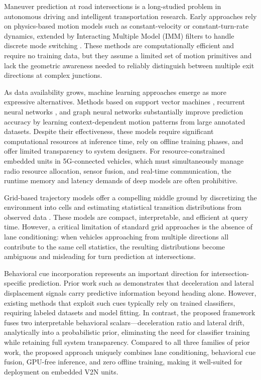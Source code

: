 \documentclass[conference]{IEEEtran}
\begin{document}
Maneuver prediction at road intersections is a long-studied problem in autonomous driving and intelligent transportation research.
Early approaches rely on physics-based motion models such as constant-velocity or constant-turn-rate dynamics, extended by Interacting Multiple Model (IMM) filters to handle discrete mode switching \cite{lefevre2014survey}.
These methods are computationally efficient and require no training data, but they assume a limited set of motion primitives and lack the geometric awareness needed to reliably distinguish between multiple exit directions at complex junctions.

As data availability grows, machine learning approaches emerge as more expressive alternatives.
Methods based on support vector machines \cite{schmerling2018multimodal}, recurrent neural networks \cite{altche2017lstm}, and graph neural networks \cite{lefkopoulos2021interaction} substantially improve prediction accuracy by learning context-dependent motion patterns from large annotated datasets.
Despite their effectiveness, these models require significant computational resources at inference time, rely on offline training phases, and offer limited transparency to system designers.
For resource-constrained embedded units in 5G-connected vehicles, which must simultaneously manage radio resource allocation, sensor fusion, and real-time communication, the runtime memory and latency demands of deep models are often prohibitive.

Grid-based trajectory models offer a compelling middle ground by discretizing the environment into cells and estimating statistical transition distributions from observed data \cite{katrakazas2015real}.
These models are compact, interpretable, and efficient at query time.
However, a critical limitation of standard grid approaches is the absence of lane conditioning: when vehicles approaching from multiple directions all contribute to the same cell statistics, the resulting distributions become ambiguous and misleading for turn prediction at intersections.

Behavioral cue incorporation represents an important direction for intersection-specific prediction.
Prior work such as \cite{klingelschmitt2014combining} demonstrates that deceleration and lateral displacement signals carry predictive information beyond heading alone.
However, existing methods that exploit such cues typically rely on trained classifiers, requiring labeled datasets and model fitting.
In contrast, the proposed framework fuses two interpretable behavioral scalars---deceleration ratio and lateral drift, analytically into a probabilistic prior, eliminating the need for classifier training while retaining full system transparency.
Compared to all three families of prior work, the proposed approach uniquely combines lane conditioning, behavioral cue fusion, GPU-free inference, and zero offline training, making it well-suited for deployment on embedded V2N units.
\end{document}
